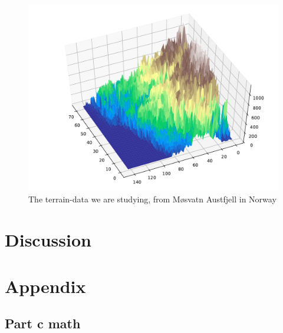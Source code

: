 \documentclass[a4paper,10pt,english]{article}
\begin{document}

\begin{figure}[H]
	\centering 
	\includegraphics[scale=0.52]{part_g_input3d.pdf}
	\caption{The terrain-data we are studying, from Møsvatn Austfjell in Norway}
	\label{part_g_input}
\end{figure}





\section{Discussion}
\label{sec:discussion}

\newpage

\section{Appendix}
\label{sec:appendix}
	
\subsection{Part c math}
\end{document}
